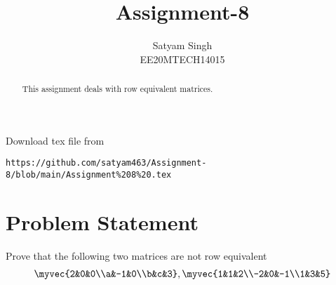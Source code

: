 \documentclass[journal,12pt,twocolumn]{IEEEtran}
\begin{document}
\renewcommand{\thefigure}{\theproblem}
\def\putbox#1#2#3{\makebox[0in][l]{\makebox[#1][l]{}\raisebox{\baselineskip}[0in][0in]{\raisebox{#2}[0in][0in]{#3}}}}
     \def\rightbox#1{\makebox[0in][r]{#1}}
     \def\centbox#1{\makebox[0in]{#1}}
     \def\topbox#1{\raisebox{-\baselineskip}[0in][0in]{#1}}
     \def\midbox#1{\raisebox{-0.5\baselineskip}[0in][0in]{#1}}
\vspace{3cm}
\title{Assignment-8}
\author{Satyam Singh \\ EE20MTECH14015}
\maketitle
\newpage
\bigskip
\renewcommand{\thefigure}{\theenumi}
\renewcommand{\thetable}{\theenumi}
\begin{abstract}
This assignment deals with row equivalent matrices.
\end{abstract}
Download  tex file from 
\begin{lstlisting}
https://github.com/satyam463/Assignment-8/blob/main/Assignment%208%20.tex
\end{lstlisting}
\section{Problem Statement}
Prove that the following two matrices are not row equivalent 
\begin{align}
    \myvec{2&0&0\\a&-1&0\\b&c&3}, \myvec{1&1&2\\-2&0&-1\\1&3&5}
\end{align}
\end{document}
